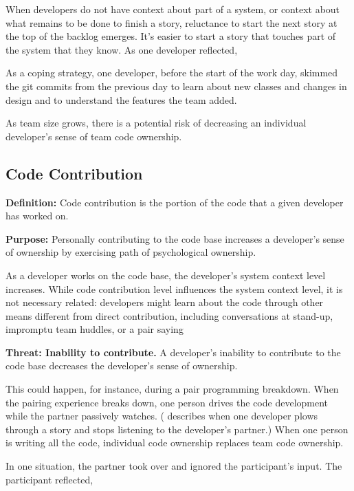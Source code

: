 When developers do not have context about part of a system, or context about what remains to be done to finish a story, reluctance to start the next story at the top of the backlog emerges. It's easier to start a story that touches part of the system that they know. As one developer reflected, 

As a coping strategy, one developer, before the start of the work day, skimmed the git commits from the previous day to learn about new classes and changes in design and to understand the features the team added. 

As team size grows, there is a potential risk of decreasing an individual developer's sense of team code ownership. 

\subsection{Code Contribution}
\textbf{Definition:} Code contribution is the portion of the code that a given developer has worked on. 

\textbf{Purpose:} Personally contributing to the code base increases a developer's sense of ownership by exercising  path of psychological ownership. 

As a developer works on the code base, the developer's system context level increases. While code contribution level influences the system context level, it is not necessary related: developers might learn about the code through other means different from direct contribution, including conversations at stand-up, impromptu team huddles, or a pair saying 

\textbf{Threat: Inability to contribute.}  A developer's inability to contribute to the code base decreases the developer's sense of ownership. 

This could happen, for instance, during a pair programming breakdown. When the pairing experience breaks down, one person drives the code development while the partner passively watches. ( describes when one developer plows through a story and stops listening to the developer's partner.)  When one person is writing all the code, individual code ownership replaces team code ownership.  

In one situation, the partner took over and ignored the participant's input. The participant reflected,  

